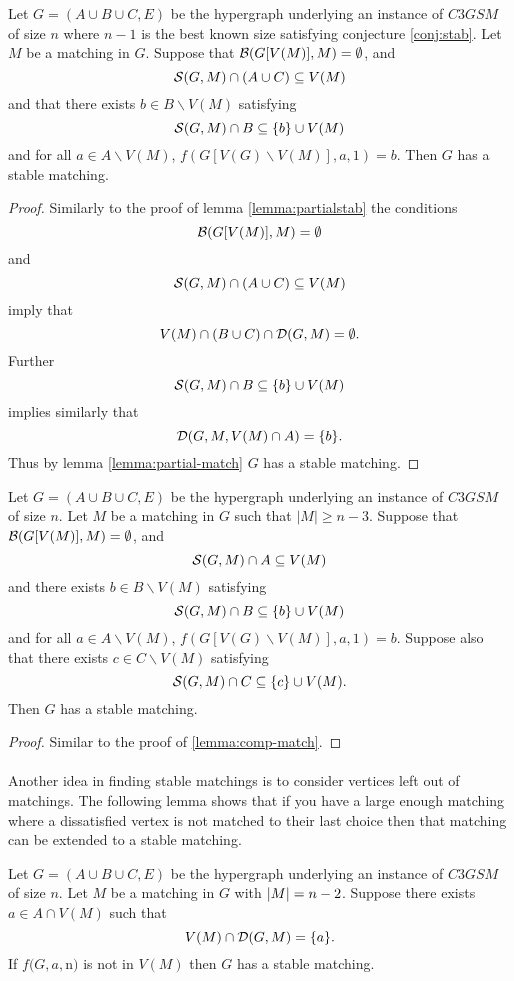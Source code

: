\begin{lemma}\label{lemma:comp-match}
Let $G=(A\cup B \cup C, E)$ be the hypergraph underlying an instance of $C3GSM$ of size $n$ where $n-1$ is the best known size satisfying conjecture \ref{conj:stab}. Let $M$ be a matching in $G$. Suppose that $\mathcal{B}(G[V(M)], M) = \emptyset$, and 
$$ \mathcal{S}(G,M) \cap (A \cup C) \subseteq V(M)$$
and that there exists $b \in B\backslash V(M)$ satisfying
$$\mathcal{S}(G,M)\cap B \subseteq \{b\} \cup V(M)$$
and for all $a \in A \backslash V(M)$, $f(G[V(G)\backslash V(M)], a, 1) = b$. Then $G$ has a stable matching.
\end{lemma}

\begin{proof}
Similarly to the proof of lemma \ref{lemma:partialstab} the conditions $$\mathcal{B}(G[V(M)], M) = \emptyset$$ and $$\mathcal{S}(G,M) \cap (A \cup C) \subseteq V(M)$$ imply that $$V(M) \cap (B\cup C) \cap \mathcal{D}(G,M) = \emptyset.$$ Further $$\mathcal{S}(G,M) \cap B \subseteq \{b\} \cup V(M)$$ implies similarly that $$\mathcal{D}(G, M, V(M) \cap A) = \{b\}.$$ Thus by lemma \ref{lemma:partial-match} $G$ has a stable matching.
\end{proof}

\begin{lemma}\label{lemma:comp-match-2}
Let $G=(A\cup B \cup C, E)$ be the hypergraph underlying an instance of $C3GSM$ of size $n$. Let $M$ be a matching in $G$ such that $|M| \geq n-3$. Suppose that $\mathcal{B}(G[V(M)],M) = \emptyset$, and
$$\mathcal{S}(G,M) \cap A \subseteq V(M)$$
and there exists $b \in B \backslash V(M)$ satisfying
$$\mathcal{S}(G,M) \cap B \subseteq \{b\} \cup V(M)$$
and for all $a \in A \backslash V(M)$, $f(G[V(G)\backslash V(M)], a, 1) = b$. Suppose also that there exists $c \in C \backslash V(M)$ satisfying
$$\mathcal{S}(G,M) \cap C \subseteq \{c\} \cup V(M).$$ 
Then $G$ has a stable matching.
\end{lemma}
\begin{proof}
Similar to the proof of \ref{lemma:comp-match}.
\end{proof}

\paragraph{}
Another idea in finding stable matchings is to consider vertices left out of matchings. The following lemma shows that if you have a large enough matching where a dissatisfied vertex is not matched to their last choice then that matching can be extended to a stable matching. 

\begin{lemma}\label{lemma:fixing}
Let $G = (A\cup B \cup C, E)$ be the hypergraph underlying an instance of $C3GSM$ of size $n$. Let $M$ be a matching in $G$ with $\left|M\right| = n-2$. Suppose there exists $a \in A \cap V(M)$ such that $$V(M) \cap \mathcal{D}(G,M) = \{a\}.$$ If $f(G, a, $n$)$ is not in $V(M)$ then $G$ has a stable matching.
\end{lemma}
